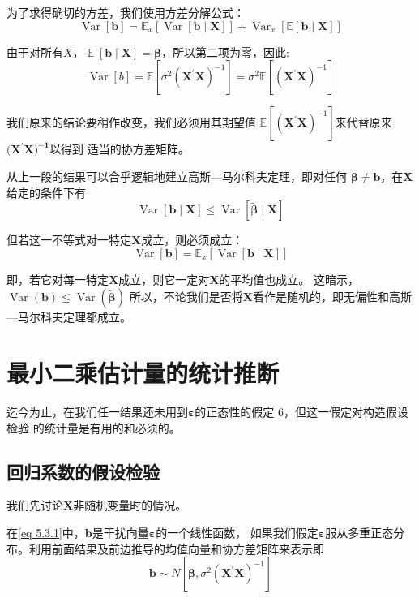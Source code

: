 为了求得确切的方差，我们使用方差分解公式：
$$ \operatorname{Var}[\boldsymbol{b}] = \mathbb{E}_{x}[\operatorname{Var}[\boldsymbol{b \mid X}]]
        +\operatorname{Var}_{x}[\mathbb{E}[ \boldsymbol{b \mid X} ]] $$

由于对所有$ X $，$ \operatorname{\mathbb{E}} [\boldsymbol{b \mid  X} ] = \boldsymbol{\beta}  $，所以第二项为零，因此:
$$ \operatorname{Var}[b]=\mathbb{E}\left[\sigma^{2}\left(\boldsymbol{X^{\prime} X}\right)^{-1}\right]=\sigma^{2} 
            \mathbb{E}\left[\left( \boldsymbol{X^{\prime} X} \right)^{-1}\right] $$ 

我们原来的结论要稍作改变，我们必须用其期望值 $ \mathbb{E}[(\boldsymbol{X^{\prime} X})^{-1}] $来代替原来$(\boldsymbol{X^{\prime} X)^{-1}} $以得到 适当的协方差矩阵。

从上一段的结果可以合乎逻辑地建立高斯—马尔科夫定理，即对任何 $\tilde{\boldsymbol{\beta} } \neq  \boldsymbol{b} $，在$ \boldsymbol{X} $给定的条件下有
$$ \operatorname{Var}[\boldsymbol{b \mid X}] \leq \operatorname{Var}[\tilde{\boldsymbol{\beta}} \mid \boldsymbol{X}] $$

但若这一不等式对一特定$ \boldsymbol{X} $成立，则必须成立：
$$ \operatorname{Var}[\boldsymbol{b}]=\mathbb{E}_{x}[\operatorname{Var}[\boldsymbol{b \mid X}]] $$ 

即，若它对每一特定$ \boldsymbol{X} $成立，则它一定对$ \boldsymbol{X} $的平均值也成立。
这暗示， $ \operatorname{Var}(\boldsymbol{b}) \leqslant \operatorname{Var}(\tilde{\boldsymbol{\beta}}) $
所以，不论我们是否将$ \boldsymbol{X} $看作是随机的，即无偏性和高斯—马尔科夫定理都成立。
\section{最小二乘估计量的统计推断}

迄今为止，在我们任一结果还未用到$ \boldsymbol{\varepsilon} $的正态性的{\heiti 假定 6}，但这一假定对构造假设检验 的统计量是有用的和必须的。
\subsection{回归系数的假设检验}
我们先讨论$ \boldsymbol{X} $非随机变量时的情况。

在\ref{eq 5.3.1}中，$ \boldsymbol{b} $是干扰向量$ \boldsymbol{\varepsilon} $的一个线性函数，
如果我们假定$ \boldsymbol{\varepsilon} $服从多重正态分布。利用前面结果及前边推导的均值向量和协方差矩阵来表示即
$$ \boldsymbol{b} \sim N\left[\boldsymbol{\beta}, \sigma^{2}\left(\boldsymbol{X^{\prime} X}\right)^{-1}\right] $$


